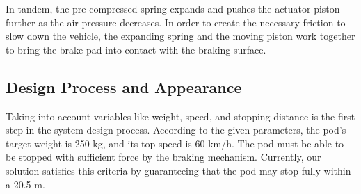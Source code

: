In tandem, the pre-compressed spring expands and pushes the actuator piston further as the air pressure decreases.
In order to create the necessary friction to slow down the vehicle, the expanding spring and the moving piston work together to bring the brake pad into contact with the braking surface.
\subsection{Design Process and Appearance}
Taking into account variables like weight, speed, and stopping distance is the first step in the system design process. According to the given parameters, the pod's target weight is 250 kg, and its top speed is 60 km/h. The pod must be able to be stopped with sufficient force by the braking mechanism. Currently, our solution satisfies this criteria by guaranteeing that the pod may stop fully within a 20.5 m.



